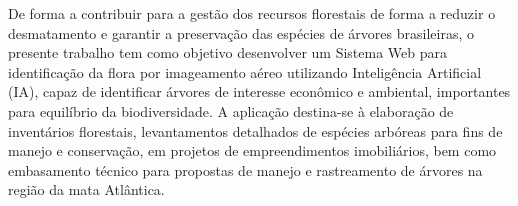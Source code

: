 De forma a contribuir para a gestão dos recursos florestais de forma a reduzir o desmatamento e garantir a preservação das espécies de árvores brasileiras, o presente trabalho tem como objetivo desenvolver um Sistema Web para identificação da flora por imageamento aéreo utilizando Inteligência Artificial (IA), capaz de identificar árvores de interesse econômico e ambiental, importantes para equilíbrio da biodiversidade. A aplicação destina-se à elaboração de inventários florestais, levantamentos detalhados de espécies arbóreas para fins de manejo e conservação, em projetos de empreendimentos imobiliários, bem como embasamento técnico para propostas de manejo e rastreamento de árvores na região da mata Atlântica.